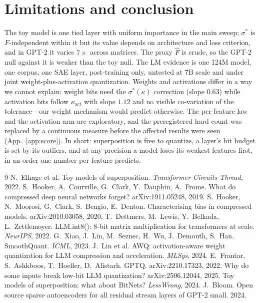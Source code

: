 \documentclass{article}
\begin{document}
\section{Limitations and conclusion}
The toy model is one tied layer with uniform importance in the main sweep; $\sigma^*$ is $F$-independent within it but its
value depends on architecture and loss criterion, and in GPT-2 it varies $7\times$ across matrices. The proxy $\hat F$ is
crude, so the GPT-2 null against it is weaker than the toy null. The LM evidence is one 124M model, one corpus, one SAE
layer, post-training only, untested at 7B scale and under joint weight-plus-activation quantization. Weights and
activations differ in a way we cannot explain: weight bits need the $\sigma^*(\kappa)$ correction (slope $0.63$) while
activation bits follow $\kappa_{\mathrm{act}}$ with slope $1.12$ and no visible co-variation of the tolerance---our weight
mechanism would predict otherwise. The per-feature law and the activation arm are exploratory, and the preregistered hard count was replaced by a
continuous measure before the affected results were seen (App.~\ref{app:score}). In short: superposition is free to quantize, a layer's bit budget is set by its outliers, and at any precision a model
loses its weakest features first, in an order one number per feature predicts.

\begin{thebibliography}{9}\small
{} N.~Elhage et al. Toy models of superposition. \emph{Transformer Circuits Thread}, 2022.
 S.~Hooker, A.~Courville, G.~Clark, Y.~Dauphin, A.~Frome. What do compressed deep neural networks forget? arXiv:1911.05248, 2019.
 S.~Hooker, N.~Moorosi, G.~Clark, S.~Bengio, E.~Denton. Characterising bias in compressed models. arXiv:2010.03058, 2020.
 T.~Dettmers, M.~Lewis, Y.~Belkada, L.~Zettlemoyer. LLM.int8(): 8-bit matrix multiplication for transformers at scale. \emph{NeurIPS}, 2022.
 G.~Xiao, J.~Lin, M.~Seznec, H.~Wu, J.~Demouth, S.~Han. SmoothQuant. \emph{ICML}, 2023.
 J.~Lin et al. AWQ: activation-aware weight quantization for LLM compression and acceleration. \emph{MLSys}, 2024.
 E.~Frantar, S.~Ashkboos, T.~Hoefler, D.~Alistarh. GPTQ. arXiv:2210.17323, 2022.
 Why do some inputs break low-bit LLM quantization? arXiv:2506.12044, 2025.
 Toy models of superposition: what about BitNets? \emph{LessWrong}, 2024.
 J.~Bloom. Open source sparse autoencoders for all residual stream layers of GPT-2 small. 2024.
\end{thebibliography}
\end{document}
